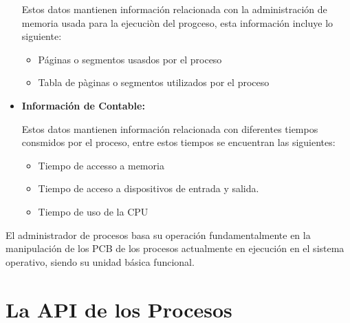 \documentclass[12pt, fleqn]{report}                             %
\begin{document}
\begin{itemize}
                        Estos datos mantienen información relacionada con la administración de memoria
                        usada para la ejecuciòn del progceso, esta información incluye lo siguiente:

                        \begin{itemize}
                            \item Páginas o segmentos usasdos por el proceso
                            \item Tabla de pàginas o segmentos utilizados por el proceso 
                        \end{itemize}
                
                \item
                    \textbf{Información de Contable:}
                    
                        Estos datos mantienen información relacionada con diferentes tiempos consmidos por
                        el proceso, entre estos tiempos se encuentran las siguientes: 
                        \begin{itemize}
                            \item Tiempo de accesso a memoria 
                            \item Tiempo de acceso a dispositivos de entrada y salida.
                            \item Tiempo de uso de la CPU
                        \end{itemize}

                \end{itemize}

                El administrador de procesos basa su operación fundamentalmente en la manipulación de los PCB
                de los procesos actualmente en ejecución en el sistema operativo, siendo su unidad básica funcional.
        


        \clearpage
        \section{La API de los Procesos}

\end{document}

